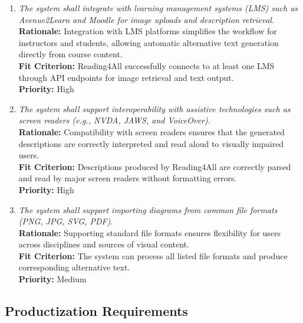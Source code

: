 \documentclass[12pt]{article}
\begin{document}
\begin{enumerate}[label=OER-IAS\arabic*., wide=0pt, leftmargin=*]
  \item \emph{The system shall integrate with learning management systems (LMS) such as Avenue2Learn and Moodle for image uploads and description retrieval.}\\[2mm]
    {\bf Rationale:} Integration with LMS platforms simplifies the workflow for instructors and students, allowing automatic alternative text generation directly from course content.\\
    {\bf Fit Criterion:} Reading4All successfully connects to at least one LMS through API endpoints for image retrieval and text output.\\
    {\bf Priority:} High

  \item \emph{The system shall support interoperability with assistive technologies such as screen readers (e.g., NVDA, JAWS, and VoiceOver).}\\[2mm]
    {\bf Rationale:} Compatibility with screen readers ensures that the generated descriptions are correctly interpreted and read aloud to visually impaired users.\\
    {\bf Fit Criterion:} Descriptions produced by Reading4All are correctly parsed and read by major screen readers without formatting errors.\\
    {\bf Priority:} High

  \item \emph{The system shall support importing diagrams from common file formats (PNG, JPG, SVG, PDF).}\\[2mm]
    {\bf Rationale:} Supporting standard file formats ensures flexibility for users across disciplines and sources of visual content.\\
    {\bf Fit Criterion:} The system can process all listed file formats and produce corresponding alternative text.\\
    {\bf Priority:} Medium
\end{enumerate}

\subsection{Productization Requirements}
\end{document}

